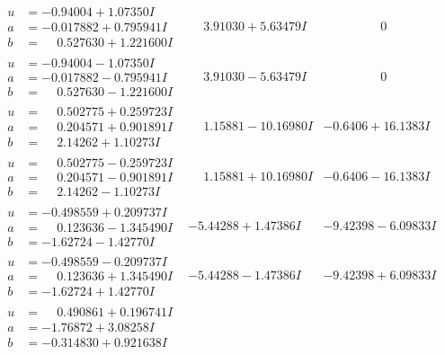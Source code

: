 \documentclass[1p]{elsarticle_modified}
\theoremstyle{definition}
\begin{document}
$$\begin{array}{c|c|c}
\begin{aligned}
u &= -0.94004 + 1.07350 I \\
a &= -0.017882 + 0.795941 I \\
b &= \phantom{-}0.527630 + 1.221600 I\end{aligned}
 & \phantom{-}3.91030 + 5.63479 I & \phantom{-0.000000 } 0 \\ \hline\begin{aligned}
u &= -0.94004 - 1.07350 I \\
a &= -0.017882 - 0.795941 I \\
b &= \phantom{-}0.527630 - 1.221600 I\end{aligned}
 & \phantom{-}3.91030 - 5.63479 I & \phantom{-0.000000 } 0 \\ \hline\begin{aligned}
u &= \phantom{-}0.502775 + 0.259723 I \\
a &= \phantom{-}0.204571 + 0.901891 I \\
b &= \phantom{-}2.14262 + 1.10273 I\end{aligned}
 & \phantom{-}1.15881 - 10.16980 I & -0.6406 + 16.1383 I \\ \hline\begin{aligned}
u &= \phantom{-}0.502775 - 0.259723 I \\
a &= \phantom{-}0.204571 - 0.901891 I \\
b &= \phantom{-}2.14262 - 1.10273 I\end{aligned}
 & \phantom{-}1.15881 + 10.16980 I & -0.6406 - 16.1383 I \\ \hline\begin{aligned}
u &= -0.498559 + 0.209737 I \\
a &= \phantom{-}0.123636 - 1.345490 I \\
b &= -1.62724 - 1.42770 I\end{aligned}
 & -5.44288 + 1.47386 I & -9.42398 - 6.09833 I \\ \hline\begin{aligned}
u &= -0.498559 - 0.209737 I \\
a &= \phantom{-}0.123636 + 1.345490 I \\
b &= -1.62724 + 1.42770 I\end{aligned}
 & -5.44288 - 1.47386 I & -9.42398 + 6.09833 I \\ \hline\begin{aligned}
u &= \phantom{-}0.490861 + 0.196741 I \\
a &= -1.76872 + 3.08258 I \\
b &= -0.314830 + 0.921638 I\end{aligned}

\end{array}$$
\end{document}
